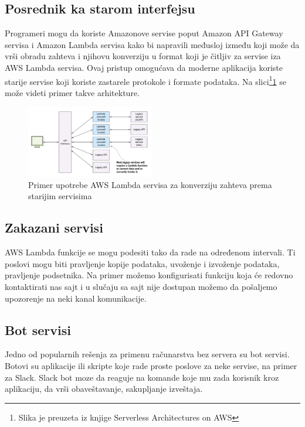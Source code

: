 \documentclass[12pt,oneside]{memoir}
\begin{document}
\subsection{Posrednik ka starom interfejsu} %

Programeri mogu da koriste Amazonove servise poput Amazon API Gateway servisa i Amazon Lambda servisa kako bi napravili međusloj između koji može da vrši obradu zahteva i njihovu konverziju u format koji je čitljiv za servise iza AWS Lambda servisa. Ovaj pristup omogućava da moderne aplikacija koriste starije servise koji koriste zastarele protokole i formate podataka. Na slici\footnote{Slika je preuzeta iz knjige Serverless Architectures on AWS}\ref{fig:KonverzijaPodataka} se može videti primer takve arhitekture.

\begin{figure}[!ht]
  \centering
  \includegraphics[width=0.5\textwidth]{Slika 9.png}
  \caption{Primer upotrebe AWS Lambda servisa za konverziju zahteva prema starijim servisima}
  \label{fig:KonverzijaPodataka}
\end{figure}

\subsection{Zakazani servisi}

AWS Lambda funkcije se mogu podesiti tako da rade na određenom intervali. Ti poslovi mogu biti pravljenje kopije podataka, uvoženje i izvoženje podataka, pravljenje podsetnika. Na primer možemo konfigurisati funkciju koja će redovno kontaktirati nas sajt i u slučaju sa sajt nije dostupan možemo da pošaljemo upozorenje na neki kanal komunikacije.

\subsection{Bot servisi}

Jedno od popularnih rešenja za primenu računarstva bez servera su bot servisi. Botovi su aplikacije ili skripte koje rade proste poslove za neke servise, na primer za Slack. Slack bot moze da reaguje na komande koje mu zada korisnik kroz aplikaciju, da vrši obaveštavanje, sakupljanje izveštaja. 
\end{document}
